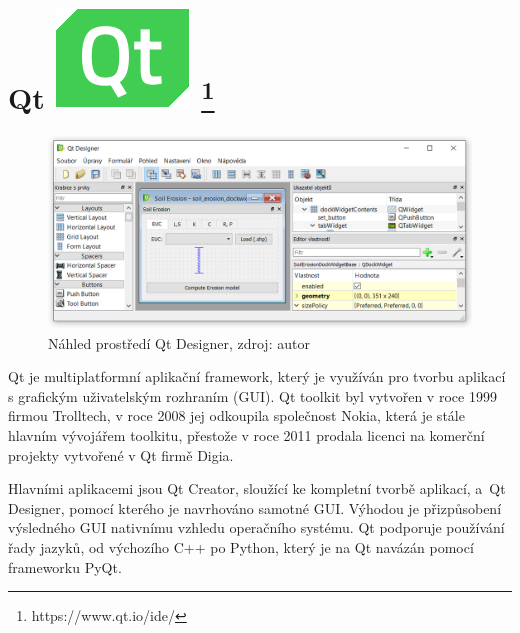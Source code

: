 \section[Qt]{Qt \includegraphics[scale=0.20]{./pictures/qt.png} 
\footnote{https://www.qt.io/ide/}}
\label{qt}
\begin{figure}[H]
    \centering \includegraphics[scale=0.6]{./pictures/qt_screen.png}
      \caption[Náhled prostředí Qt Designer]
      {Náhled prostředí Qt Designer, zdroj: autor}
      \label{screen:qt}
\end{figure}
Qt je multiplatformní aplikační framework, který je využíván pro
tvorbu aplikací s grafickým uživatelským rozhraním (GUI). Qt toolkit
byl vytvořen v roce 1999 firmou Trolltech, v roce 2008 jej odkoupila
společnost Nokia, která je stále hlavním vývojářem toolkitu, přestože
v roce 2011 prodala licenci na komerční projekty vytvořené v Qt firmě
Digia.

Hlavními aplikacemi jsou Qt Creator, sloužící ke kompletní tvorbě
aplikací, a~Qt Designer, pomocí kterého je navrhováno samotné
GUI. Výhodou je přizpůsobení výsledného GUI nativnímu vzhledu
operačního systému. Qt podporuje používání řady jazyků, od výchozího
C++ po Python, který je na Qt navázán pomocí frameworku PyQt.\cite{qt}
\cite{rapidPyQt}
